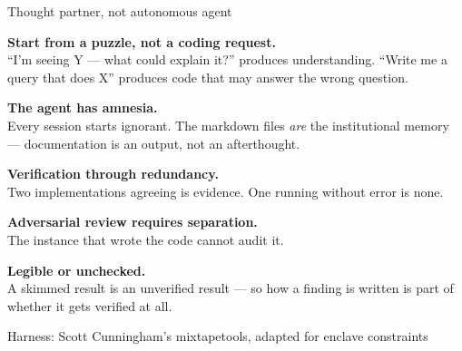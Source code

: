 \documentclass[notes,11pt, aspectratio=169, xcolor={table}]{beamer}
\newenvironment{wideitemize}{\itemize\addtolength{\itemsep}{3pt}}{\enditemize}
\newcommand{\code}[1]{{\ttfamily\small #1}}
\begin{document}
\begin{frame}{Thought partner, not autonomous agent}

\vspace{0.4em}
\begin{wideitemize}
\item \textbf{Start from a puzzle, not a coding request.}\\
  \small ``I'm seeing Y --- what could explain it?'' produces understanding. ``Write me a
  query that does X'' produces code that may answer the wrong question.
\item \textbf{The agent has amnesia.}\\
  \small Every session starts ignorant. The markdown files \emph{are} the institutional
  memory --- documentation is an output, not an afterthought.
\item \textbf{Verification through redundancy.}\\
  \small Two implementations agreeing is evidence. One running without error is none.
\item \textbf{Adversarial review requires separation.}\\
  \small The instance that wrote the code cannot audit it.
\item \textbf{Legible or unchecked.}\\
  \small A skimmed result is an unverified result --- so how a finding is written is part of
  whether it gets verified at all.
\end{wideitemize}


\vspace{0.4em}
\begin{center}\small
Harness: Scott Cunningham's \code{mixtapetools}, adapted for enclave constraints
\end{center}
\end{frame}
\end{document}
